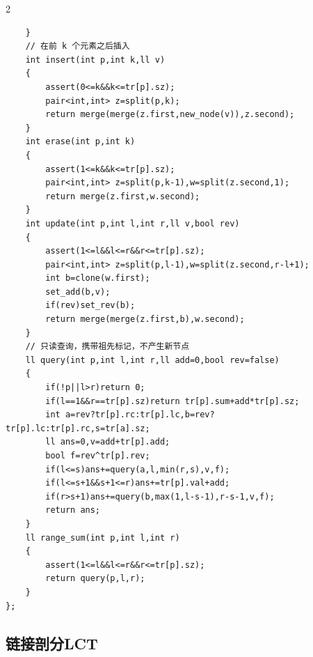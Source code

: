 \documentclass[UTF8,fontset=fandol,a4paper,twoside]{ctexart}
\begin{document}
\begin{multicols}{2}
\begin{lstlisting}
    }
    // 在前 k 个元素之后插入
    int insert(int p,int k,ll v)
    {
        assert(0<=k&&k<=tr[p].sz);
        pair<int,int> z=split(p,k);
        return merge(merge(z.first,new_node(v)),z.second);
    }
    int erase(int p,int k)
    {
        assert(1<=k&&k<=tr[p].sz);
        pair<int,int> z=split(p,k-1),w=split(z.second,1);
        return merge(z.first,w.second);
    }
    int update(int p,int l,int r,ll v,bool rev)
    {
        assert(1<=l&&l<=r&&r<=tr[p].sz);
        pair<int,int> z=split(p,l-1),w=split(z.second,r-l+1);
        int b=clone(w.first);
        set_add(b,v);
        if(rev)set_rev(b);
        return merge(merge(z.first,b),w.second);
    }
    // 只读查询，携带祖先标记，不产生新节点
    ll query(int p,int l,int r,ll add=0,bool rev=false)
    {
        if(!p||l>r)return 0;
        if(l==1&&r==tr[p].sz)return tr[p].sum+add*tr[p].sz;
        int a=rev?tr[p].rc:tr[p].lc,b=rev?tr[p].lc:tr[p].rc,s=tr[a].sz;
        ll ans=0,v=add+tr[p].add;
        bool f=rev^tr[p].rev;
        if(l<=s)ans+=query(a,l,min(r,s),v,f);
        if(l<=s+1&&s+1<=r)ans+=tr[p].val+add;
        if(r>s+1)ans+=query(b,max(1,l-s-1),r-s-1,v,f);
        return ans;
    }
    ll range_sum(int p,int l,int r)
    {
        assert(1<=l&&l<=r&&r<=tr[p].sz);
        return query(p,l,r);
    }
};
\end{lstlisting}
\subsection{链接剖分LCT}


\end{multicols}
\end{document}
